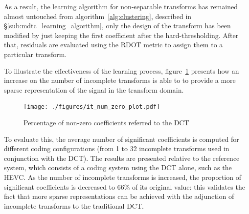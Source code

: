 \documentclass[11pt,a4paper,openright,twoside]{book}
\numberwithin{equation}{section} %
\numberwithin{figure}{section} %
\numberwithin{table}{section} %
\begin{document}
As a result, the learning algorithm for non-separable transforms has remained
almost untouched from algorithm~\ref{alg:clustering}, described in
\S\ref{sub:mdtc_learning_algorithm}, only the design of the transform has been
modified by just keeping the first coefficient after the hard-thresholding.
After that, residuals are evaluated using the \ac{RDOT} metric to assign them
to a particular transform.

To illustrate the effectiveness of the learning process,
figure~\ref{fig:it_num_zero} presents how an increase on the number of
incomplete transforms is able to to provide a more sparse representation of
the signal in the transform domain.

\begin{figure}[tp]
	\centering
	\texttt{[image: ./figures/it\_num\_zero\_plot.pdf]}
	\caption{Percentage of non-zero coefficients referred to the \acs{DCT}}
	\label{fig:it_num_zero}
\end{figure}

To evaluate this, the average number of significant coefficients is computed
for different coding configurations (from 1 to 32 incomplete transforms used
in conjunction with the \ac{DCT}).
The results are presented relative to the reference system, which consists of
a coding system using the \ac{DCT} alone, such as the \ac{HEVC}.
As the number of incomplete transforms is increased, the proportion of
significant coefficients is decreased to 66\% of its original value:
this validates the fact that more sparse representations can be achieved with
the adjunction of incomplete transforms to the traditional \ac{DCT}.
\end{document}

